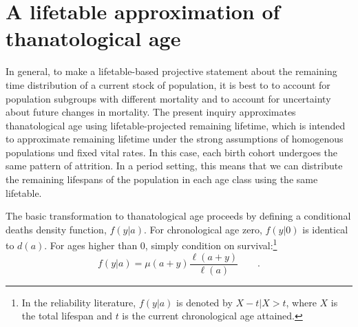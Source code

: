 \documentclass{article}
\newcommand{\ep}{\quad\quad\text{.}}
\begin{document}
\section*{A lifetable approximation of thanatological age}
In general, to make a lifetable-based projective statement about the remaining
time distribution of a current stock of population, it is best to to account for population subgroups
with different mortality and to account for uncertainty about future changes in
mortality.
The present inquiry approximates thanatological age using lifetable-projected remaining lifetime,
which is intended to approximate remaining lifetime under the strong
assumptions of homogenous populations und fixed vital rates. 
In this case, each birth cohort undergoes the same
pattern of attrition. In a period setting, this means that we can distribute the
remaining lifespans of the population in each age class using the same
lifetable.

The basic transformation to thanatological age proceeds by defining a
conditional deaths density function, $f(y|a)$. For chronological
age zero, $f(y|0)$ is identical to $d(a)$. For ages higher than 0, simply
condition on survival:\footnote{In the reliability literature, $f(y|a)$ is
denoted by $ X - t | X > t $, where $X$ is the total lifespan and $t$ is the
current chronological age attained.}
\begin{equation}
\label{eq:vaupel1}
f(y | a) = \mu(a+y)\frac{\ell(a+y)}{\ell(a)} \ep
\end{equation}
\end{document}
